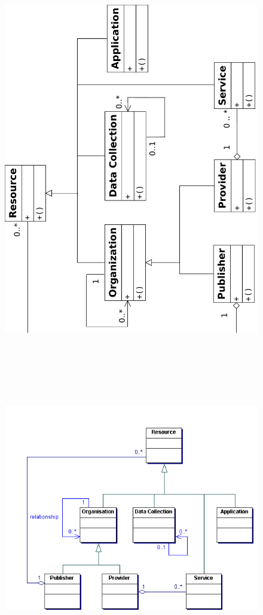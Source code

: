     \begin{figure}[!htbp]
      \begin{center}
        \leavevmode
        \ifpdf
        \includegraphics[scale = 1]{resources}
        \else
        \includegraphics[bb = 92 86 545 742, height=6in]{resource.png}

\end{center}
\end{figure}
